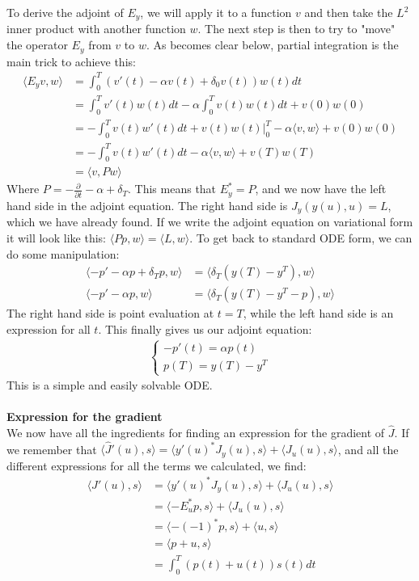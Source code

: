 \documentclass[11pt,a4paper]{report}
\begin{document}
To derive the adjoint of $E_y$, we will apply it to a function $v$ and then take the $L^2$ inner product with another function $w$. The next step is then to try to "move" the operator $E_y$ from $v$ to $w$. As becomes clear below, partial integration is the main trick to achieve this: 
\begin{align*}
\langle E_yv,w \rangle &=  \int_0^T(v'(t)-\alpha v(t)+\delta_0v(t))w(t)dt \\ &= \int_0^Tv'(t)w(t)dt -\alpha\int_0^Tv(t)w(t) dt +v(0)w(0) \\
& = -\int_0^Tv(t)w'(t)dt +v(t)w(t)|_0^T-\alpha\langle v,w\rangle +v(0)w(0) \\
&=-\int_0^Tv(t)w'(t)dt -\alpha\langle v,w\rangle +v(T)w(T) \\
&= \langle v,Pw \rangle
\end{align*} 
Where $P=-\frac{\partial}{\partial t} -\alpha + \delta_T$. This means that $E_y^* = P$, and we now have the left hand side in the adjoint equation. The right hand side is $J_y(y(u),u)=L$, which we have already found. If we write the  adjoint equation on variational form it will look like this: $\langle Pp,w\rangle = \langle L,w\rangle$. To get back to standard ODE form, we can do some manipulation: 
\begin{align*}
\langle -p'-\alpha p +\delta_T p,w \rangle &= \langle \delta_T(y(T)-y^T),w\rangle \\
\langle -p'-\alpha p ,w \rangle &= \langle \delta_T(y(T)-y^T -p),w\rangle
\end{align*}
The right hand side is point evaluation at $t=T$, while the left hand side is an expression for all $t$. This finally gives us our adjoint equation: 
\begin{align*}
   \left\{
     \begin{array}{lr}
       -p'(t) = \alpha p(t) \\
       p(T) = y(T)-y^T
     \end{array}
   \right.
\end{align*}
This is a simple and easily solvable ODE.
\\
\\
\textbf{Expression for the gradient}
\\
We now have all the ingredients for finding an expression for the gradient of $\hat{J}$. If we remember that $\langle\hat{J}'(u),s\rangle=\langle y'(u)^*J_y(u),s\rangle +\langle J_u(u),s\rangle$, and all the different expressions for all the terms we calculated, we find:
\begin{align*}
\langle\hat{J}'(u),s\rangle&=\langle y'(u)^*J_y(u),s\rangle +\langle J_u(u),s\rangle \\ &=\langle -E_u^*p,s\rangle +\langle J_u(u),s\rangle \\
&=\langle -(-1)^*p,s\rangle +\langle u,s\rangle \\
&=\langle p+u,s\rangle \\
&= \int_0^T(p(t)+u(t))s(t)dt
\end{align*} 
\end{document}
